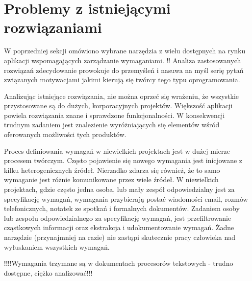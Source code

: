   \section{Problemy z istniejącymi rozwiązaniami}

      W poprzedniej sekcji omówiono wybrane narzędzia z wielu dostępnych na rynku aplikacji wspomagających zarządzanie wymaganiami. !! Analiza zastosowanych rozwiązań zdecydowanie prowokuje do przemyśleń i nasuwa na myśl serię pytań związanych motywacjami jakimi kierują się twórcy tego typu oprogramowania. 

      Analizując istniejące rozwiązania, nie można oprzeć się wrażeniu, że wszystkie przystosowane są do dużych, korporacyjnych projektów. Większość aplikacji powiela rozwiązania znane i sprawdzone funkcjonalności. W konsekwencji trudnym zadaniem jest znalezienie wyróżniających się elementów wśród oferowanych możliwości tych produktów. 

      Proces definiowania wymagań w niewielkich projektach jest w dużej mierze procesem twórczym. Często pojawienie się nowego wymagania jest inicjowane z kilku heterogenicznych źródeł. Nierzadko zdarza się również, że to samo wymaganie jest różnie komunikowane przez wiele źródeł. W niewielkich projektach, gdzie często jedna osoba, lub mały zespół odpowiedzialny jest za specyfikację wymagań, wymagania przybierają postać wiadomości email, rozmów telefonicznych, notatek ze spotkań i formalnych dokumentów. Zadaniem osoby lub zespołu odpowiedzialnego za specyfikację wymagań, jest przefiltrowanie cząstkowych informacji oraz ekstrakcja i udokumentowanie wymagań. Żadne narzędzie (przynajmniej na razie) nie zastąpi skutecznie pracy człowieka nad wyłuskaniem wszystkich wymagań. 

      !!!!Wymagania trzymane są w dokumentach procesorów tekstowych - trudno dostępne, ciężko analizować!!!
